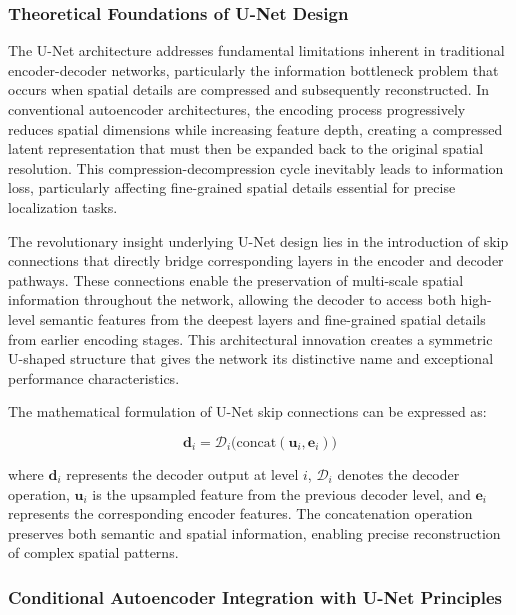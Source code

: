 \documentclass[12pt,a4paper]{report}
\begin{document}
\subsubsection*{Theoretical Foundations of U-Net Design}

The U-Net architecture addresses fundamental limitations inherent in traditional encoder-decoder networks, particularly the information bottleneck problem that occurs when spatial details are compressed and subsequently reconstructed. In conventional autoencoder architectures, the encoding process progressively reduces spatial dimensions while increasing feature depth, creating a compressed latent representation that must then be expanded back to the original spatial resolution. This compression-decompression cycle inevitably leads to information loss, particularly affecting fine-grained spatial details essential for precise localization tasks.

The revolutionary insight underlying U-Net design lies in the introduction of skip connections that directly bridge corresponding layers in the encoder and decoder pathways. These connections enable the preservation of multi-scale spatial information throughout the network, allowing the decoder to access both high-level semantic features from the deepest layers and fine-grained spatial details from earlier encoding stages. This architectural innovation creates a symmetric U-shaped structure that gives the network its distinctive name and exceptional performance characteristics.

The mathematical formulation of U-Net skip connections can be expressed as:

\begin{equation}
\mathbf{d}_i = \mathcal{D}_i\big(\text{concat}(\mathbf{u}_i, \mathbf{e}_i)\big)
\end{equation}

where $\mathbf{d}_i$ represents the decoder output at level $i$, $\mathcal{D}_i$ denotes the decoder operation, $\mathbf{u}_i$ is the upsampled feature from the previous decoder level, and $\mathbf{e}_i$ represents the corresponding encoder features. The concatenation operation preserves both semantic and spatial information, enabling precise reconstruction of complex spatial patterns.

\subsubsection*{Conditional Autoencoder Integration with U-Net Principles}
\end{document}
